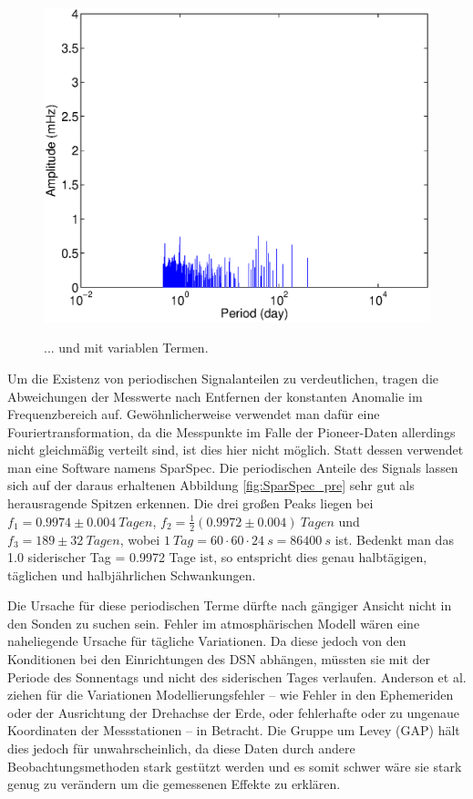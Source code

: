 \begin{figure}[htnb]
\begin{minipage}[t]{.48\linewidth}
	\includegraphics[width=\linewidth]{images/SparSpec_end}
	\label{fig:SparSpec_post}
  \caption{... und mit variablen Termen.}
\end{minipage}
 \end{figure}

Um die Existenz von periodischen Signalanteilen zu verdeutlichen, tragen die Abweichungen der Messwerte nach Entfernen der konstanten Anomalie im Frequenzbereich auf. Gewöhnlicherweise verwendet man dafür eine Fouriertransformation, da die Messpunkte im Falle der Pioneer-Daten allerdings nicht gleichmäßig verteilt sind, ist dies hier nicht möglich. Statt dessen verwendet man eine Software namens SparSpec.
Die periodischen Anteile des Signals lassen sich auf der daraus erhaltenen Abbildung \ref{fig:SparSpec_pre} sehr gut als herausragende Spitzen erkennen.
Die drei großen Peaks liegen bei $f_1=0.9974\pm0.004\ Tagen$, $f_2=\frac12(0.9972\pm0.004)\ Tagen$ und 
$f_3=189\pm32\ Tagen$, wobei $ 1\ Tag = 60 \cdot 60 \cdot 24 \:s = 86400\:s$ ist.
Bedenkt man das 1.0 siderischer Tag = 0.9972 Tage ist, so entspricht dies genau halbtägigen, täglichen und halbjährlichen Schwankungen.

Die Ursache für diese periodischen Terme dürfte nach gängiger Ansicht nicht in den Sonden zu suchen sein. Fehler im atmosphärischen Modell wären eine naheliegende Ursache für tägliche Variationen. Da diese jedoch von den Konditionen bei den Einrichtungen des DSN abhängen, müssten sie mit der Periode des Sonnentags und nicht des siderischen Tages verlaufen\cite{Levy2009}.
Anderson et al. ziehen für die Variationen Modellierungsfehler – wie Fehler in den Ephemeriden oder der Ausrichtung der Drehachse der Erde, oder fehlerhafte oder zu ungenaue Koordinaten der Messstationen – in Betracht\cite{Levy2009}\cite{Dittus2006}. %
Die Gruppe um Levey (GAP) hält dies jedoch für unwahrscheinlich, da diese Daten durch andere Beobachtungsmethoden
stark gestützt werden und es somit schwer wäre sie stark genug zu verändern um die gemessenen Effekte zu erklären. %

